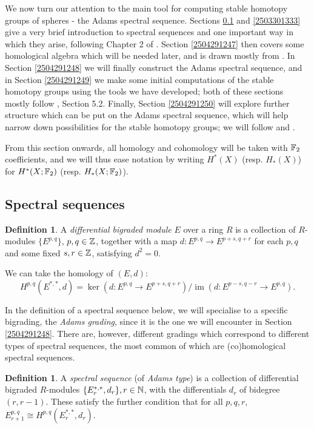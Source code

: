 \documentclass[11pt, titlepage]{article} %
\def\bb{\ensuremath\mathbb}
\def\inte{\ensuremath\mathbb{Z}}
\def\nat{\ensuremath\mathbb{N}}
\DeclareMathOperator{\im}{im}
\numberwithin{equation}{subsection}
\theoremstyle{plain}
\theoremstyle{definition}
\newtheorem{definition}[theorem]{Definition}
\begin{document}
We now turn our attention to the main tool for computing stable homotopy groups of spheres - the Adams spectral sequence. Sections \ref{2504041910} and \ref{2503301333} give a very brief introduction to spectral sequences and one important way in which they arise, following Chapter 2 of \autocite{spectral_sequences}. Section \ref{2504291247} then covers some homological algebra which will be needed later, and is drawn mostly from \autocite{weibel}. In Section \ref{2504291248} we will finally construct the Adams spectral sequence, and in Section \ref{2504291249} we make some initial computations of the stable homotopy groups using the tools we have developed; both of these sections mostly follow \autocite{hatcher5}, Section 5.2. Finally, Section \ref{2504291250} will explore further structure which can be put on the Adams spectral sequence, which will help narrow down possibilities for the stable homotopy groups; we will follow \autocite{ass} and \autocite{rognes2}. 

From this section onwards, all homology and cohomology will be taken with \(\bb{F}_2\) coefficients, and we will thus ease notation by writing \(H^*(X)\) (resp. \(H_*(X)\)) for \(H^*(X; \bb{F}_2)\) (resp. \(H_*(X;\bb{F}_2)\)).

\subsection{Spectral sequences}\label{2504041910}

\begin{definition}
A \textit{differential bigraded module} \(E\) over a ring \(R\) is a collection of \(R\)-modules \(\{E^{p, q}\}\), \(p, q\in \inte\), together with a map \(d : E^{p, q} \to E^{p+s, q+r}\) for each \(p, q\) and some fixed \(s,r \in \inte\), satisfying \(d^2=0\). 
\end{definition}

We can take the homology of \((E, d)\):
\[H^{p, q}(E^{*, *}, d)=\ker(d : E^{p, q}\to E^{p+s, q+r})/\im(d : E^{p-s, q-r}\to E^{p, q}).\]

In the definition of a spectral sequence below, we will specialise to a specific bigrading, the \textit{Adams grading}, since it is the one we will encounter in Section \ref{2504291248}. There are, however, different gradings which correspond to different types of spectral sequences, the most common of which are (co)homological spectral sequences. 

\begin{definition}
A \textit{spectral sequence} (of \textit{Adams type}) is a collection of differential bigraded \(R\)-modules \(\{E^{*, *}_r, d_r\}, r \in \nat\), with the differentials \(d_r\) of bidegree \((r, r-1)\). These satisfy the further condition that for all \(p, q, r\), \(E^{p, q}_{r+1}\cong H^{p, q}(E_r^{*, *}, d_r)\).
\end{definition}
\end{document}
